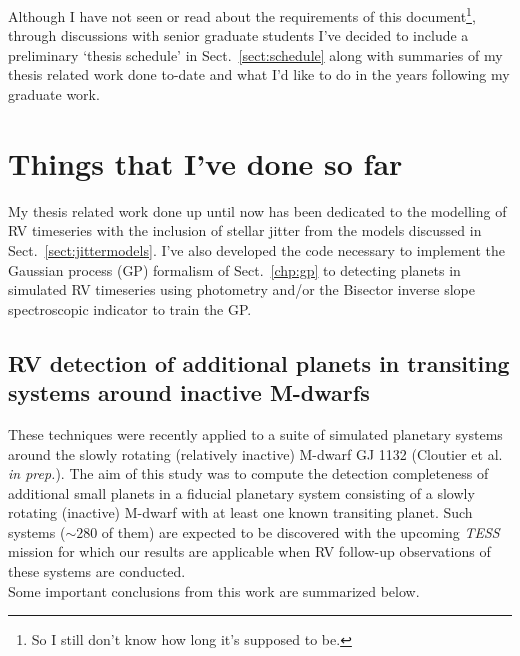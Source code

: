 Although I have not seen or read about the requirements of this document\footnote{So I still 
don't know how long it's supposed to be.}, through 
discussions with senior graduate students I've decided to include a preliminary `thesis 
schedule' in Sect.~\ref{sect:schedule} 
along with summaries of my thesis related work done to-date and what I'd like 
to do in the years following my graduate work.

\section{Things that I've done so far} \label{sect:donesofar}
My thesis related work done up until now has been dedicated to the modelling of RV 
timeseries with the inclusion of stellar jitter from the models discussed in 
Sect.~\ref{sect:jittermodels}. I've also developed the code necessary to implement the 
Gaussian process (GP) formalism of Sect.~\ref{chp:gp} to detecting planets in simulated 
RV timeseries using photometry and/or the Bisector inverse slope spectroscopic 
indicator to train the GP. \\

\subsection{RV detection of additional planets in transiting systems around inactive M-dwarfs}
These techniques were recently applied to a suite of simulated planetary systems around 
the slowly rotating (relatively inactive) M-dwarf GJ 1132 (Cloutier et al. \emph{in prep.}). 
The aim of this study was to compute the detection completeness 
of additional small planets in a fiducial planetary system consisting of a slowly rotating 
(inactive) M-dwarf with at least one known transiting planet. Such systems ($\sim 280$ 
of them) 
are expected to be discovered with the upcoming \emph{TESS} mission for which our 
results are applicable when RV follow-up observations of these systems are conducted. \\

Some important conclusions from this work are summarized below.

